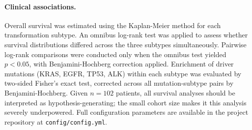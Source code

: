 \paragraph{Clinical associations.}
Overall survival was estimated using the Kaplan-Meier method for each transformation
subtype.
An omnibus log-rank test was applied to assess whether survival distributions differed
across the three subtypes simultaneously.
Pairwise log-rank comparisons were conducted only when the omnibus test yielded
$p < 0.05$, with Benjamini-Hochberg correction applied.
Enrichment of driver mutations (KRAS, EGFR, TP53, ALK) within each subtype was
evaluated by two-sided Fisher's exact test, corrected across all mutation-subtype
pairs by Benjamini-Hochberg.
Given $n = 102$ patients, all survival analyses should be interpreted as
hypothesis-generating; the small cohort size makes it this analysis severely underpowered.
Full configuration parameters are available in the project repository at
\texttt{config/config.yml}.
